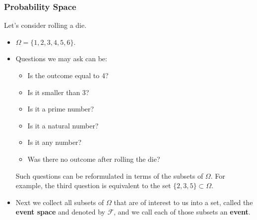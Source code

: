 \documentclass{beamer}
\begin{document}
\begin{frame}
    \frametitle{Probability Space}
    Let's consider rolling a die.
    \pause
    
    \begin{itemize}[<+->]
        \item $\Omega=\{1,2,3,4,5,6\}$.
        \item Questions we may ask can be: 
        \begin{itemize}[<+->]
            \item Is the outcome equal to 4?
            \item Is it smaller than 3?
            \item Is it a prime number?
            \item Is it a natural number?
            \item Is it any number?
            \item Was there no outcome after rolling the die?
        \end{itemize}
        \pause        Such questions can be reformulated in terms of the
subsets of $\Omega$. For example, the third question is equivalent to the set $\{2, 3, 5\} \subset \Omega$.

        \item Next we collect all subsets of $\Omega$ that are of interest to us into a set, called the \textbf{event space} and denoted by $\mathcal{F}$, and we call each of those subsets an \textbf{event}.

    \end{itemize}
    
\end{frame}


    
\end{document}
